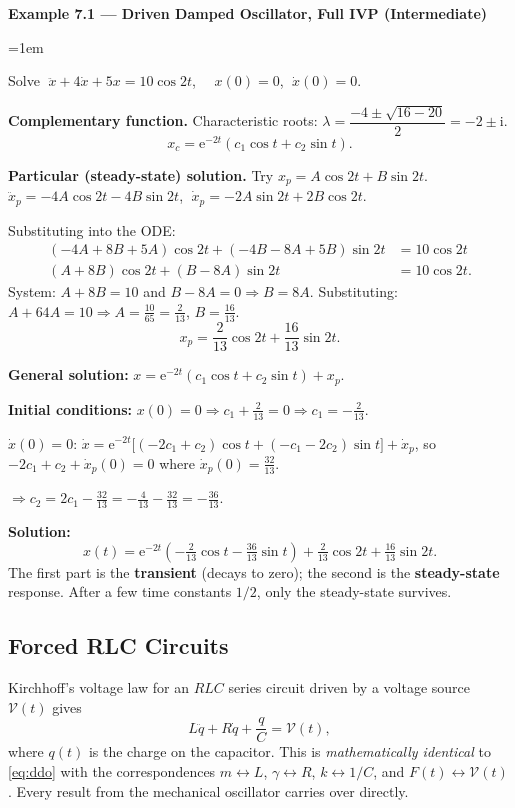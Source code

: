 \documentclass[12pt,a4paper]{article}
\newenvironment{example}[1]{%
  \vspace{0.8em}
  \noindent{\footnotesize\scshape\color{orange!50!black} Example}\par
  \noindent\textbf{#1}\par\vspace{0.3em}
  \begin{list}{}{\leftmargin=1em\rightmargin=0pt}\item
}{%
  \end{list}\vspace{0.8em}
}
\newcommand{\ee}{\mathrm{e}}
\newcommand{\ii}{\mathrm{i}}
\begin{document}
\begin{example}{Example 7.1 --- Driven Damped Oscillator, Full IVP (Intermediate)}
Solve $\;\ddot{x} + 4\dot{x} + 5x = 10\cos 2t$, $\quad x(0)=0$, $\;\dot{x}(0)=0$.

\medskip
\textbf{Complementary function.} Characteristic roots:
$\lambda = \dfrac{-4\pm\sqrt{16-20}}{2} = -2\pm\ii$.
\[
  x_c = \ee^{-2t}(c_1\cos t + c_2\sin t).
\]

\textbf{Particular (steady-state) solution.} Try $x_p = A\cos 2t + B\sin 2t$.
$\ddot x_p = -4A\cos 2t - 4B\sin 2t$, $\;\dot x_p = -2A\sin 2t + 2B\cos 2t$.

Substituting into the ODE:
\begin{align*}
  (-4A+8B+5A)\cos 2t + (-4B-8A+5B)\sin 2t &= 10\cos 2t\\
  (A + 8B)\cos 2t + (B - 8A)\sin 2t &= 10\cos 2t.
\end{align*}
System: $A + 8B = 10$ and $B - 8A = 0 \Rightarrow B = 8A$.
Substituting: $A + 64A = 10 \Rightarrow A = \frac{10}{65} = \frac{2}{13}$,
$B = \frac{16}{13}$.
\[
  x_p = \frac{2}{13}\cos 2t + \frac{16}{13}\sin 2t.
\]

\textbf{General solution:} $x = \ee^{-2t}(c_1\cos t + c_2\sin t) + x_p$.

\textbf{Initial conditions:} $x(0)=0 \Rightarrow c_1 + \tfrac{2}{13} = 0
\Rightarrow c_1 = -\tfrac{2}{13}$.

$\dot x(0)=0$: $\dot x = \ee^{-2t}\bigl[(-2c_1+c_2)\cos t + (-c_1-2c_2)\sin t\bigr]
+ \dot x_p$, so $-2c_1+c_2 + \dot x_p(0) = 0$ where
$\dot x_p(0) = \tfrac{32}{13}$.

$\Rightarrow c_2 = 2c_1 - \tfrac{32}{13} = -\tfrac{4}{13} - \tfrac{32}{13}
= -\tfrac{36}{13}$.

\textbf{Solution:}
\[
  \boxed{x(t) = \ee^{-2t}\!\left(-\tfrac{2}{13}\cos t - \tfrac{36}{13}\sin t\right)
          + \tfrac{2}{13}\cos 2t + \tfrac{16}{13}\sin 2t.}
\]
The first part is the \textbf{transient} (decays to zero); the second is the
\textbf{steady-state} response. After a few time constants $1/2$, only the
steady-state survives.
\end{example}

\subsection{Forced RLC Circuits}

Kirchhoff's voltage law for an $RLC$ series circuit driven by a voltage source
$\mathcal{V}(t)$ gives
\begin{equation}
  L\ddot{q} + R\dot{q} + \frac{q}{C} = \mathcal{V}(t),
  \label{eq:rlc_forced}
\end{equation}
where $q(t)$ is the charge on the capacitor. This is \emph{mathematically
identical} to \eqref{eq:ddo} with the correspondences $m\leftrightarrow L$,
$\gamma\leftrightarrow R$, $k\leftrightarrow 1/C$, and $F(t)\leftrightarrow\mathcal{V}(t)$.
Every result from the mechanical oscillator carries over directly.
\end{document}
